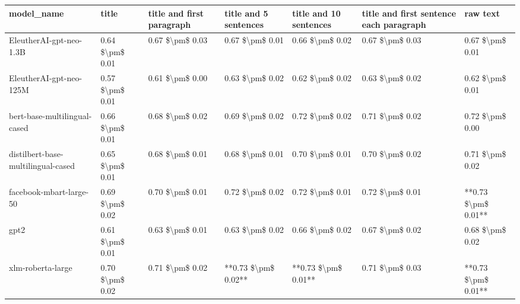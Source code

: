 \begin{tabular}{lllllll}
\toprule
                        model\_name &           title & title and first paragraph & title and 5 sentences & title and 10 sentences & title and first sentence each paragraph &            raw text \\
\midrule
           EleutherAI-gpt-neo-1.3B & 0.64 \$\textbackslash pm\$ 0.01 &           0.67 \$\textbackslash pm\$ 0.03 &       0.67 \$\textbackslash pm\$ 0.01 &        0.66 \$\textbackslash pm\$ 0.02 &                         0.67 \$\textbackslash pm\$ 0.03 &     0.67 \$\textbackslash pm\$ 0.01 \\
           EleutherAI-gpt-neo-125M & 0.57 \$\textbackslash pm\$ 0.01 &           0.61 \$\textbackslash pm\$ 0.00 &       0.63 \$\textbackslash pm\$ 0.02 &        0.62 \$\textbackslash pm\$ 0.02 &                         0.63 \$\textbackslash pm\$ 0.02 &     0.62 \$\textbackslash pm\$ 0.01 \\
      bert-base-multilingual-cased & 0.66 \$\textbackslash pm\$ 0.01 &           0.68 \$\textbackslash pm\$ 0.02 &       0.69 \$\textbackslash pm\$ 0.02 &        0.72 \$\textbackslash pm\$ 0.02 &                         0.71 \$\textbackslash pm\$ 0.02 &     0.72 \$\textbackslash pm\$ 0.00 \\
distilbert-base-multilingual-cased & 0.65 \$\textbackslash pm\$ 0.01 &           0.68 \$\textbackslash pm\$ 0.01 &       0.68 \$\textbackslash pm\$ 0.01 &        0.70 \$\textbackslash pm\$ 0.01 &                         0.70 \$\textbackslash pm\$ 0.02 &     0.71 \$\textbackslash pm\$ 0.02 \\
           facebook-mbart-large-50 & 0.69 \$\textbackslash pm\$ 0.02 &           0.70 \$\textbackslash pm\$ 0.01 &       0.72 \$\textbackslash pm\$ 0.02 &        0.72 \$\textbackslash pm\$ 0.01 &                         0.72 \$\textbackslash pm\$ 0.01 & **0.73 \$\textbackslash pm\$ 0.01** \\
                              gpt2 & 0.61 \$\textbackslash pm\$ 0.01 &           0.63 \$\textbackslash pm\$ 0.01 &       0.63 \$\textbackslash pm\$ 0.02 &        0.66 \$\textbackslash pm\$ 0.02 &                         0.67 \$\textbackslash pm\$ 0.02 &     0.68 \$\textbackslash pm\$ 0.02 \\
                 xlm-roberta-large & 0.70 \$\textbackslash pm\$ 0.02 &           0.71 \$\textbackslash pm\$ 0.02 &   **0.73 \$\textbackslash pm\$ 0.02** &    **0.73 \$\textbackslash pm\$ 0.01** &                         0.71 \$\textbackslash pm\$ 0.03 & **0.73 \$\textbackslash pm\$ 0.01** \\
\bottomrule
\end{tabular}
